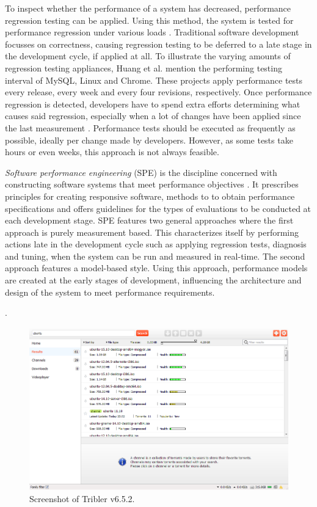 To inspect whether the performance of a system has decreased, performance regression testing can be applied.
Using this method, the system is tested for performance regression under various loads \cite{woodside2007future}.
Traditional software development focusses on correctness, causing regression testing to be deferred to a late stage in the development cycle, if applied at all.
To illustrate the varying amounts of regression testing appliances, Huang et al. mention the performing testing interval of MySQL, Linux and Chrome.
These projects apply performance tests every release, every week and every four revisions, respectively.
Once performance regression is detected, developers have to spend extra efforts determining what causes said regression, especially when a lot of changes have been applied since the last measurement \cite{huang2014performance}.
Performance tests should be executed as frequently as possible, ideally per change made by developers.
However, as some tests take hours or even weeks, this approach is not always feasible.

\emph{Software performance engineering} (SPE) is the discipline concerned with constructing software systems that meet performance objectives \cite{smith2003best}.
It prescribes principles for creating responsive software, methods to to obtain performance specifications and offers guidelines for the types of evaluations to be conducted at each development stage.
SPE features two general approaches \cite{woodside2007future} where the first approach is purely measurement based.
This characterizes itself by performing actions late in the development cycle such as  applying regression tests, diagnosis and tuning, when the system can be run and measured in real-time.
The second approach features a model-based style.
Using this approach, performance models are created at the early stages of development, influencing the architecture and design of the system to meet performance requirements.

.

\begin{figure}[!h]
	\centering
	\includegraphics[width=\linewidth]{introduction/images/tribler_screenshot.png}
	\caption{Screenshot of Tribler v6.5.2.}
	\label{fig:tribler_screenshot}
\end{figure}

